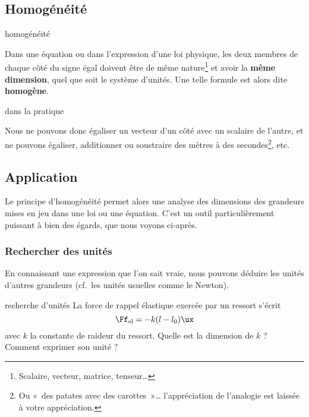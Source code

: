 \documentclass[a4paper, 12pt, final, garamond]{book}
\begin{document}
\subsection{Homogénéité}

\begin{tcbraster}[raster columns=2, raster equal height=rows]
    \begin{prop}[label=prop:homo, hand]{homogénéité}

        Dans une équation ou dans l'expression d'une loi physique, les deux
        membres de chaque côté du signe égal doivent être de même
        nature\footnote{Scalaire, vecteur, matrice, tenseur…} et avoir la
        \textbf{même dimension}, quel que soit le système d'unités. Une telle
        formule est alors dite \textbf{homogène}.

    \end{prop}
    \begin{impl}[label=impl:homo]{dans la pratique}

        Nous ne pouvons donc égaliser un vecteur d'un côté avec un scalaire de
        l'autre, et ne pouvons égaliser, additionner ou soustraire des mètres à
        des secondes\footnote{Ou «~des patates avec des carottes~»…
        l'appréciation de l'analogie est laissée à votre appréciation.}, etc.

    \end{impl}
\end{tcbraster}

\subsection{Application}

Le principe d'homogénéité permet alors une analyse des dimensions des grandeurs
mises en jeu dans une loi ou une équation. C'est un outil particulièrement
puissant à bien des égards, que nous voyons ci-après.

\subsubsection{Rechercher des unités}

En connaissant une expression que l'on sait vraie, nous pouvons déduire les
unités d'autres grandeurs (cf.\ les unités usuelles comme le Newton).

\begin{exem}[label=exem:homounit]{recherche d'unités}
    La force de rappel élastique exercée par un ressort s'écrit
    \[\Ff_{\rm el} = -k(l-l_0)\ux\]
    avec $k$ la constante de raideur du ressort. Quelle est la dimension de $k$
    ? Comment exprimer son unité ?
    \tcblower
    \vspace{3cm}
\end{exem}
\end{document}
